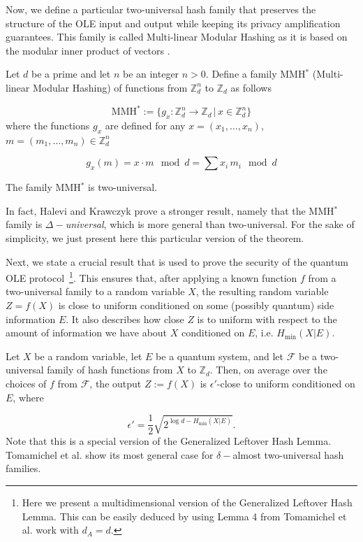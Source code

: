 Now, we define a particular two-universal hash family that preserves the structure of the OLE input and output while keeping its privacy amplification guarantees. This family is called Multi-linear Modular Hashing as it is based on the modular inner product of vectors \cite{HK97}.
\begin{definition}
Let $d$ be a prime and let $n$ be an integer $n>0$. Define a family MMH$^*$ (Multi-linear Modular Hashing) of functions from $\mathbb{Z}_d^n$ to $\mathbb{Z}_d$ as follows

$$\text{MMH}^*:= \{ g_x : \mathbb{Z}_d^n\rightarrow \mathbb{Z}_d \, | \, x\in \mathbb{Z}_d^n \}$$
where the functions $g_x$ are defined for any $x = (x_1,\ldots,x_n)$, $m = (m_1,\ldots, m_n) \in \mathbb{Z}_d^n$

$$g_x(m) = x\cdot m \mod d = \sum x_i\, m_i \mod d$$
\label{def:MMH}
\end{definition}



\begin{theorem}
The family MMH$^*$ is two-universal.
\end{theorem}
In fact, Halevi and Krawczyk \cite{HK97} prove a stronger result, namely that the MMH$^*$ family is \textit{$\Delta-$universal}, which is more general than two-universal. For the sake of simplicity, we just present here this particular version of the theorem.

Next, we state a crucial result that is used to prove the security of the quantum OLE protocol~\footnote{Here we present a multidimensional version of the Generalized Leftover Hash Lemma. This can be easily deduced by using Lemma 4 from Tomamichel et al. work \cite{TSSR11} with $d_A = d$.}. This ensures that, after applying a known function $f$ from a two-universal family to a random variable $X$, the resulting random variable $Z = f(X)$ is close to uniform conditioned on some (possibly quantum) side information $E$. It also describes how close $Z$ is to uniform with respect to the amount of information we have about $X$ conditioned on $E$, i.e. $H_\text{min}(X|E)$.

\begin{lemma}
Let $X$ be a random variable, let $E$ be a quantum system, and let $\mathcal{F}$ be a two-universal family of hash functions from $X$ to $\mathbb{Z}_d$. Then, on average over the choices of $f$ from $\mathcal{F}$, the output $Z := f(X)$ is $\epsilon'$-close to uniform conditioned on $E$, where

\begin{equation}
  \epsilon' = \frac{1}{2}\sqrt{2^{\log d - H_\text{min}(X|E)}}.  
\end{equation}
Note that this is a special version of the Generalized Leftover Hash Lemma. Tomamichel et al. \cite{TSSR11} show its most general case for $\delta-$almost two-universal hash families. \label{lem:leftover}
\end{lemma}


